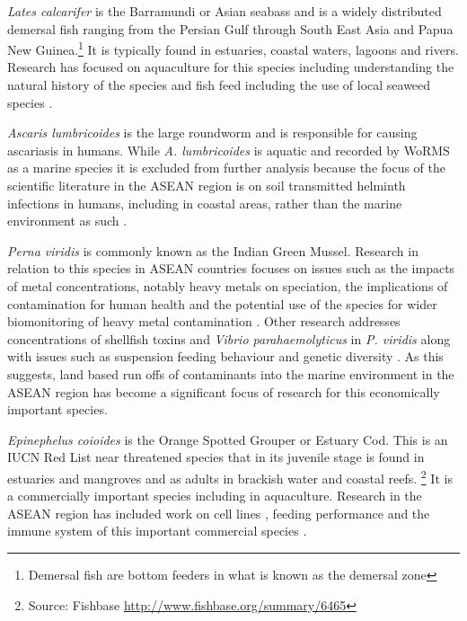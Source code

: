 \documentclass[openany]{book}
\let\rmarkdownfootnote\footnote%
\def\footnote{\protect\rmarkdownfootnote}
\theoremstyle{definition}
\theoremstyle{definition}
\theoremstyle{definition}
\theoremstyle{remark}
\begin{document}
\emph{Lates calcarifer} is the Barramundi or Asian seabass and is a
widely distributed demersal fish ranging from the Persian Gulf through
South East Asia and Papua New Guinea.\footnote{Demersal fish are bottom
  feeders in what is known as the demersal zone} It is typically found
in estuaries, coastal waters, lagoons and rivers. Research has focused
on aquaculture for this species including understanding the natural
history of the species \citep{Shadrin_2015} and fish feed
\citep{Shansudin_1997, Mohd_Yusof_2010} including the use of local
seaweed species \citep{Shapawi_2015}.

\emph{Ascaris lumbricoides} is the large roundworm and is responsible
for causing ascariasis in humans. While \emph{A. lumbricoides} is
aquatic and recorded by WoRMS as a marine species it is excluded from
further analysis because the focus of the scientific literature in the
ASEAN region is on soil transmitted helminth infections in humans,
including in coastal areas, rather than the marine environment as such
\citep{Montresor_2007}.

\emph{Perna viridis} is commonly known as the Indian Green Mussel.
Research in relation to this species in ASEAN countries focuses on
issues such as the impacts of metal concentrations, notably heavy metals
on speciation, the implications of contamination for human health and
the potential use of the species for wider biomonitoring of heavy metal
contamination \citep{Yap_2002, Yap_2004, Yap_2003}. Other research
addresses concentrations of shellfish toxins and \emph{Vibrio
parahaemolyticus} in \emph{P. viridis} \citep{Marasigan_2001} along with
issues such as suspension feeding behaviour
\citep{Hawkins_1998, Tan_2016} and genetic diversity \citep{Ye_2015}. As
this suggests, land based run offs of contaminants into the marine
environment in the ASEAN region has become a significant focus of
research for this economically important species.

\emph{Epinephelus coioides} is the Orange Spotted Grouper or Estuary
Cod. This is an IUCN Red List near threatened species that in its
juvenile stage is found in estuaries and mangroves and as adults in
brackish water and coastal reefs. \footnote{Source: Fishbase
  \url{http://www.fishbase.org/summary/6465}} It is a commercially
important species including in aquaculture. Research in the ASEAN region
has included work on cell lines \citep{Qin_2006}, feeding performance
\citep{Doi_1997, Eusebio_2004} and the immune system of this important
commercial species \citep{Zhou_2011, Guo_2012}.
\end{document}
